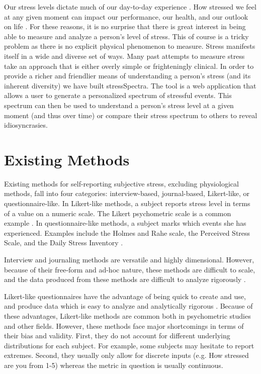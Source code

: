 \documentclass{sigchi}
\begin{document}
Our stress levels dictate much of our day-to-day experience \cite{kanner1981comparison} \cite{levy1997relationship}. How stressed we feel at any given moment can impact our performance, our health, and our outlook on life \cite{delongis1988impact} \cite{bolger1989effects}. For these reasons, it is no surprise that there is great interest in being able to measure and analyze a person's level of stress. This of course is a tricky problem as there is no explicit physical phenomenon to measure. Stress manifests itself in a wide and diverse set of ways. Many past attempts to measure stress take an approach that is either overly simple or frighteningly clinical. In order to provide a richer and friendlier means of understanding a person's stress (and its inherent diversity) we have built stressSpectra. The tool is a web application that allows a user to generate a personalized spectrum of stressful events. This spectrum can then be used to understand a person's stress level at a given moment (and thus over time) or compare their stress spectrum to others to reveal idiosyncrasies. 


\section{Existing Methods}
Existing methods for self-reporting subjective stress, excluding physiological methods, fall into four categories: interview-based, journal-based, Likert-like, or questionnaire-like. In Likert-like methods, a subject reports stress level in terms of a value on a numeric scale. The Likert psychometric scale is a common example \cite{maurer1998comparison}. In questionnaire-like methods, a subject marks which events she has experienced. Examples include the Holmes and Rahe scale, the Perceived Stress Scale, and the Daily Stress Inventory \cite{CSHSquestionnaires} \cite{holmes1967social} \cite{brantley1988convergence}. 

Interview and journaling methods are versatile and highly dimensional. However, because of their free-form and ad-hoc nature, these methods are difficult to scale, and the data produced from these methods are difficult to analyze rigorously \cite{howtomeasureinhumans}.

Likert-like questionnaires have the advantage of being quick to create and use, and produce data which is easy to analyze and analytically rigorous \cite{bland1997statistics}. Because of these advantages, Likert-like methods are common both in psychometric studies and other fields. However, these methods face major shortcomings in terms of their bias and validity. First, they do not account for different underlying distributions for each subject. For example, some subjects may hesitate to report extremes. Second, they usually only allow for discrete inputs (e.g. How stressed are you from 1-5) whereas the metric in question is usually continuous.
\end{document}
